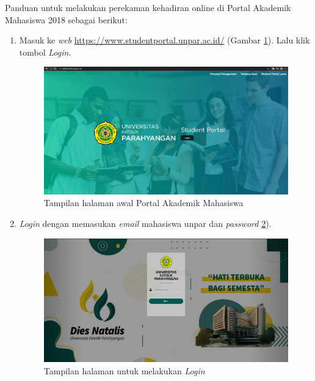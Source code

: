 Panduan untuk melakukan perekaman kehadiran online di Portal Akademik Mahasiswa 2018 sebagai berikut:
\begin{enumerate}
	\item Masuk ke \textit{web} \url{https://www.studentportal.unpar.ac.id/} (Gambar \ref{fig:studpor_home}). Lalu klik tombol \textit{Login}.
		\begin{figure}[H]
		\centering
		\includegraphics[scale=0.3]{Gambar/halamanWeb.jpg}
		\caption{Tampilan halaman awal Portal Akademik Mahasiswa} 
		\label{fig:studpor_home}
	\end{figure}
	
	\vspace{2cm}
	\item \textit{Login} dengan memasukan \textit{email} mahasiswa unpar dan \textit{password} \ref{fig:pam_login}).
	\begin{figure}[H]
		\centering
		\includegraphics[scale=0.3]{Gambar/login.jpg}
		\caption{Tampilan halaman untuk melakukan \textit{Login}} 
		\label{fig:pam_login}
	\end{figure}
	

\end{enumerate}

